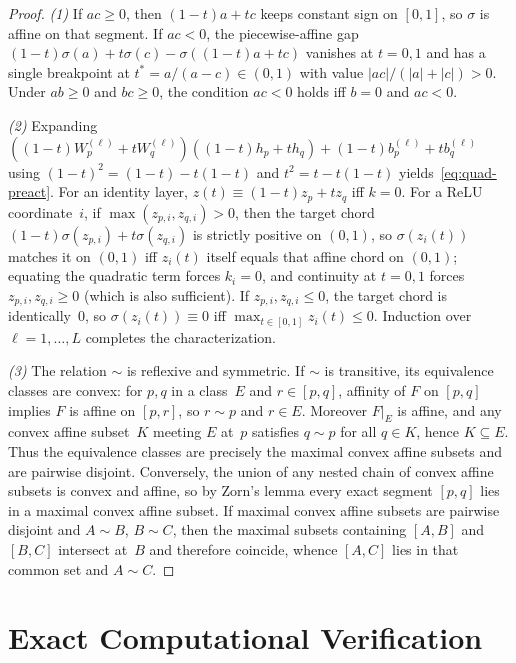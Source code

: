 \documentclass[11pt]{article}
\theoremstyle{plain}
\theoremstyle{definition}
\theoremstyle{remark}
\begin{document}
\begin{proof}
\emph{(1)} If $ac \ge 0$, then $(1 - t)a + tc$ keeps constant sign on $[0, 1]$, so $\sigma$ is affine on that segment. If $ac < 0$, the piecewise-affine gap $(1 - t)\sigma(a) + t\sigma(c) - \sigma((1 - t)a + tc)$ vanishes at $t = 0, 1$ and has a single breakpoint at $t^* = a/(a - c) \in (0, 1)$ with value $|ac|/(|a| + |c|) > 0$. Under $ab \ge 0$ and $bc \ge 0$, the condition $ac < 0$ holds iff $b = 0$ and $ac < 0$.

\emph{(2)} Expanding $((1 - t)W_p^{(\ell)} + tW_q^{(\ell)})((1 - t)h_p + th_q) + (1 - t)b_p^{(\ell)} + tb_q^{(\ell)}$ using $(1 - t)^2 = (1 - t) - t(1 - t)$ and $t^2 = t - t(1 - t)$ yields~\eqref{eq:quad-preact}. For an identity layer, $z(t) \equiv (1 - t)z_p + t z_q$ iff $k = 0$. For a ReLU coordinate~$i$, if $\max(z_{p,i}, z_{q,i}) > 0$, then the target chord $(1 - t)\sigma(z_{p,i}) + t\sigma(z_{q,i})$ is strictly positive on $(0, 1)$, so $\sigma(z_i(t))$ matches it on $(0, 1)$ iff $z_i(t)$ itself equals that affine chord on $(0, 1)$; equating the quadratic term forces $k_i = 0$, and continuity at $t = 0, 1$ forces $z_{p,i}, z_{q,i} \ge 0$ (which is also sufficient). If $z_{p,i}, z_{q,i} \le 0$, the target chord is identically~$0$, so $\sigma(z_i(t)) \equiv 0$ iff $\max_{t \in [0, 1]} z_i(t) \le 0$. Induction over $\ell = 1, \dots, L$ completes the characterization.

\emph{(3)} The relation $\sim$ is reflexive and symmetric. If $\sim$ is transitive, its equivalence classes are convex: for $p, q$ in a class~$E$ and $r \in [p, q]$, affinity of $F$ on $[p, q]$ implies $F$ is affine on $[p, r]$, so $r \sim p$ and $r \in E$. Moreover $F|_E$ is affine, and any convex affine subset~$K$ meeting $E$ at~$p$ satisfies $q \sim p$ for all $q \in K$, hence $K \subseteq E$. Thus the equivalence classes are precisely the maximal convex affine subsets and are pairwise disjoint. Conversely, the union of any nested chain of convex affine subsets is convex and affine, so by Zorn's lemma every exact segment $[p, q]$ lies in a maximal convex affine subset. If maximal convex affine subsets are pairwise disjoint and $A \sim B$, $B \sim C$, then the maximal subsets containing $[A, B]$ and $[B, C]$ intersect at~$B$ and therefore coincide, whence $[A, C]$ lies in that common set and $A \sim C$.
\end{proof}

\section{Exact Computational Verification}
\end{document}
